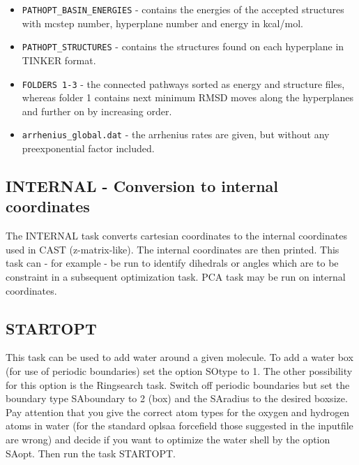 \documentclass[10pt,a4paper]{article} %
\begin{document}
\begin{itemize}
	
	\item \texttt{PATHOPT\_BASIN\_ENERGIES} - contains the energies of the accepted structures with mcstep number, hyperplane number and energy in kcal/mol.
	
	\item \texttt{PATHOPT\_STRUCTURES} - contains the structures found on each hyperplane in TINKER format.
	
	\item \texttt{FOLDERS 1-3} - the connected pathways sorted as energy and structure files, whereas folder 1 contains next minimum RMSD moves along the hyperplanes and further on by increasing order.
	
	
	\item \texttt{arrhenius\_global.dat} - the arrhenius rates are given, but without any preexponential factor included.
	
\end{itemize}
	
	\subsection{INTERNAL - Conversion to internal coordinates}	
	The INTERNAL task converts cartesian coordinates to the internal coordinates used in CAST (z-matrix-like). The internal coordinates are then printed. This task can - for example - be run to identify dihedrals or angles which are to be constraint in a subsequent optimization task. \ac{PCA} task may be run on internal coordinates.

	\subsection{STARTOPT}	
	
	This task can be used to add water around a given molecule. To add a water box (for use of periodic boundaries) set the option SOtype to 1. The other possibility for this option is the Ringsearch task. Switch off periodic boundaries but set the boundary type SAboundary to 2 (box) and the SAradius to the desired boxsize. Pay attention that you give the correct atom types for the oxygen and hydrogen atoms in water (for the standard oplsaa forcefield those suggested in the inputfile are wrong) and decide if you want to optimize the water shell by the option SAopt. Then run the task STARTOPT.\\
	
\end{document}
